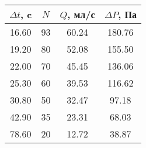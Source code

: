\begin{tabular}{c|c|c|c}
\toprule
$\Delta t$, c & $N$ & $Q$, мл/с & $\Delta P$, Па \\
\midrule
16.60 & 93 & 60.24 & 180.76 \\
19.20 & 80 & 52.08 & 155.50 \\
22.00 & 70 & 45.45 & 136.06 \\
25.30 & 60 & 39.53 & 116.62 \\
30.80 & 50 & 32.47 & 97.18 \\
42.90 & 35 & 23.31 & 68.03 \\
78.60 & 20 & 12.72 & 38.87 \\
\bottomrule
\end{tabular}

